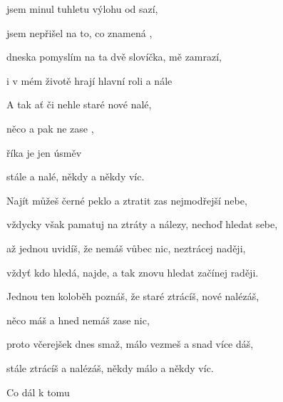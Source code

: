 

    

\zs
{} jsem minul tuhletu výlohu  od sazí,

 jsem nepřišel na to, co znamená ,

 dneska pomyslím na ta dvě slovíčka,  mě zamrazí,

 i v mém životě hrají hlavní roli  a nále
\ks

\zr
A tak ať  či nehle staré  nové nalé,

něco  a pak ne zase ,

říka je jen  úsměv  

stále  a nalé, někdy  a někdy víc.
\kr

\zs
Najít můžeš černé peklo a ztratit zas nejmodřejší nebe,

vždycky však pamatuj na ztráty a nálezy, nechoď hledat sebe,

až jednou uvidíš, že nemáš vůbec nic, neztrácej naději,

vždyť kdo hledá, najde, a tak znovu hledat začínej raději.
\ks

\zr
Jednou ten koloběh poznáš, že staré ztrácíš, nové nalézáš,

něco máš a hned nemáš zase nic,

proto včerejšek dnes smaž, málo vezmeš a snad více dáš,

stále ztrácíš a nalézáš, někdy málo a někdy víc.
\kr

Co dál k tomu      

\kp
























